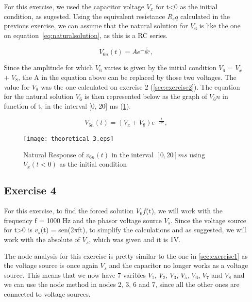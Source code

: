 For this exercise, we used the capacitor voltage $V_x$ for t<0 as the initial condition, as sugested. Using the equivalent resistance $R_eq$ calculated in the previous exercise, we can assume that the natural solution for $V_6$ is like the one on equation~\ref{eq:naturalsolution}, as this is a RC series.

\begin{equation}
  V_{6n}(t) = Ae^{-\frac{t}{RC}},
  \label{eq:naturalsolution}
\end{equation}

Since the amplitude for which $V_6$ varies is given by the initial condition  $V_6$ = $V_x$ + $V_8$, the A in the equation above can be replaced by those two voltages. The value for $V_8$ was the one calculated on exercise 2 (\ref{sec:exercise2}). The equation for the natural solution $V_6$ is then represented below as the graph of $V_6n$ in function of t, in the interval [0, 20] ms (\ref{fig:theoretical_3}). 

\begin{equation}
  V_{6n}(t) = (V_{x} + V_{8})e^{-\frac{t}{RC}},
  \label{eq:naturalsolution2}
\end{equation}


\begin{figure}[!ht] \centering
\caption{Natural Response of $v_{6n}(t)$ in the interval $[0,20]ms$ using $V_x(t<0)$ as the initial condition}
\squeezeup  
\texttt{[image: theoretical\_3.eps]}
\label{fig:theoretical_3}
\end{figure}


\subsection{Exercise 4}
\label{sec:exercise4}


For this exercise, to find the forced solution $V_6f$(t), we will work with the frequency f = 1000 Hz and the phasor voltage source $V_s$. Since the voltage source for t>0 is $v_s$(t) = sen(2$\pi$ft), to simplify the calculations and as suggested, we will work with the absolute of $V_s$, which was given and it is 1V. 

The node analysis for this exercise is pretty similar to the one in \ref{sec:exercise1} as the voltage source is once again $V_s$ and the capacitor no longer works as a voltage source. This means that we now have 7 varibles $V_1$, $V_2$, $V_3$, $V_5$, $V_6$, $V_7$ and $V_8$ and we can use the node method in nodes 2, 3, 6 and 7, since all the other ones are connected to voltage sources.

